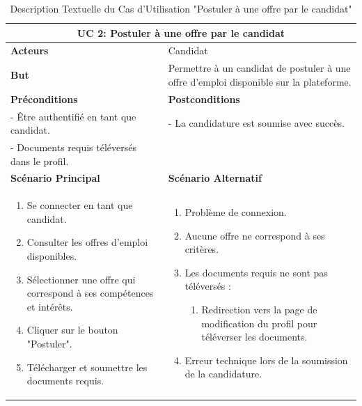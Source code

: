 \begin{minipage}{\textwidth}
    \begin{table}[H]
    \centering
    \caption{Description Textuelle du Cas d'Utilisation "Postuler à une offre par le candidat"}
    \begin{tabular}{| m{8cm} | m{8cm} |}
    \hline
    \multicolumn{2}{|c|}{\textbf{UC 2:} Postuler à une offre par le candidat} \\ \hline
    \textbf{Acteurs} & Candidat \\ \hline
    \textbf{But} & Permettre à un candidat de postuler à une offre d'emploi disponible sur la plateforme. \\ \hline
    \textbf{Préconditions} & \textbf{Postconditions} \\ \hline
    - Être authentifié en tant que candidat. & - La candidature est soumise avec succès. \\ 
    - Documents requis téléversés dans le profil. & \\ \hline
    \textbf{Scénario Principal} & \textbf{Scénario Alternatif} \\ \hline
    \begin{enumerate}
        \item Se connecter en tant que candidat.
        \item Consulter les offres d'emploi disponibles.
        \item Sélectionner une offre qui correspond à ses compétences et intérêts.
        \item Cliquer sur le bouton "Postuler".
        \item Télécharger et soumettre les documents requis.
    \end{enumerate} & 
    \begin{enumerate}
        \item Problème de connexion.
        \item Aucune offre ne correspond à ses critères.
        \item Les documents requis ne sont pas téléversés :
            \begin{enumerate}
                \item Redirection vers la page de modification du profil pour téléverser les documents.
            \end{enumerate}
        \item Erreur technique lors de la soumission de la candidature.
    \end{enumerate} \\ \hline
    \end{tabular}
    \label{tab:UCPostuler_Offre}
    \end{table}
\end{minipage}

